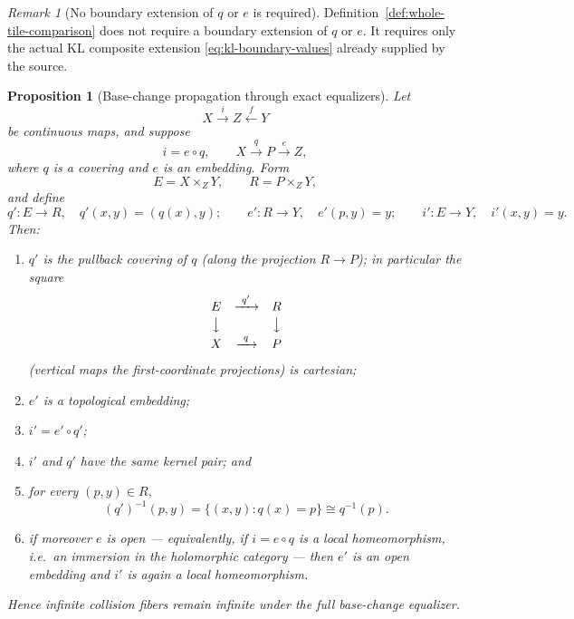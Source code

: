 \documentclass[11pt,reqno]{amsart}
\newtheorem{proposition}[theorem]{Proposition}
\theoremstyle{definition}
\theoremstyle{remark}
\newtheorem{remark}[theorem]{Remark}
\begin{document}
\begin{remark}[No boundary extension of \(q\) or \(e\) is required]\label{rem:no-extension-needed}
Definition~\ref{def:whole-tile-comparison} does not require a boundary extension of \(q\) or \(e\).  It requires only the actual KL composite extension \eqref{eq:kl-boundary-values} already supplied by the source.
\end{remark}
\begin{proposition}[Base-change propagation through exact equalizers]\label{prop:base-change}
Let
\[
X\xrightarrow{\ i\ }Z\xleftarrow{\ f\ }Y
\]
be continuous maps, and suppose
\[
i=e\circ q,\qquad X\xrightarrow{\ q\ }P\xrightarrow{\ e\ }Z,
\]
where \(q\) is a covering and \(e\) is an embedding.  Form
\[
E=X\times_ZY,\qquad R=P\times_ZY,
\]
and define
\begin{equation}\label{eq:base-change-maps}
q'\colon E\to R,\quad q'(x,y)=(q(x),y);
\qquad
e'\colon R\to Y,\quad e'(p,y)=y;
\qquad
i'\colon E\to Y,\quad i'(x,y)=y.
\end{equation}
Then:
\begin{enumerate}
\item \(q'\) is the pullback covering of \(q\) (along the projection \(R\to P\)); in particular the square
\[
\begin{array}{ccc}
E&\xrightarrow{\ q'\ }&R\\[2pt]
\big\downarrow&&\big\downarrow\\[2pt]
X&\xrightarrow{\ q\ }&P
\end{array}
\]
(vertical maps the first-coordinate projections) is cartesian;
\item \(e'\) is a topological embedding;
\item \(i'=e'\circ q'\);
\item \(i'\) and \(q'\) have the same kernel pair; and
\item for every \((p,y)\in R\),
\begin{equation}\label{eq:fiber-bijection}
(q')^{-1}(p,y)=\{(x,y):q(x)=p\}\cong q^{-1}(p).
\end{equation}
\item if moreover \(e\) is \emph{open} --- equivalently, if \(i=e\circ q\) is a local homeomorphism, i.e.\ an immersion in the holomorphic category --- then \(e'\) is an open embedding and \(i'\) is again a local homeomorphism.
\end{enumerate}
Hence infinite collision fibers remain infinite under the full base-change equalizer.
\end{proposition}
\end{document}
